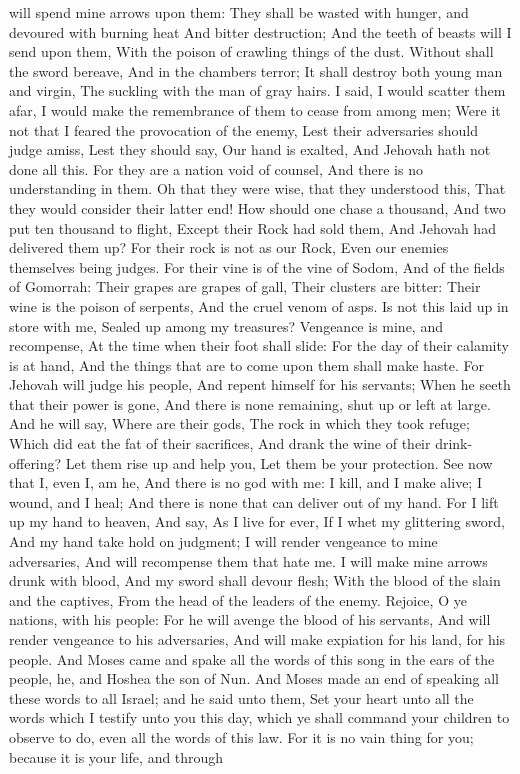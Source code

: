 will spend mine arrows upon them:  They shall be wasted with hunger, and devoured with burning heat And bitter destruction; And the teeth of beasts will I send upon them, With the poison of crawling things of the dust.  Without shall the sword bereave, And in the chambers terror; It shall destroy both young man and virgin, The suckling with the man of gray hairs.  I said, I would scatter them afar, I would make the remembrance of them to cease from among men;  Were it not that I feared the provocation of the enemy, Lest their adversaries should judge amiss, Lest they should say, Our hand is exalted, And Jehovah hath not done all this.  For they are a nation void of counsel, And there is no understanding in them.  Oh that they were wise, that they understood this, That they would consider their latter end!  How should one chase a thousand, And two put ten thousand to flight, Except their Rock had sold them, And Jehovah had delivered them up?  For their rock is not as our Rock, Even our enemies themselves being judges.  For their vine is of the vine of Sodom, And of the fields of Gomorrah: Their grapes are grapes of gall, Their clusters are bitter:  Their wine is the poison of serpents, And the cruel venom of asps.  Is not this laid up in store with me, Sealed up among my treasures?  Vengeance is mine, and recompense, At the time when their foot shall slide: For the day of their calamity is at hand, And the things that are to come upon them shall make haste.  For Jehovah will judge his people, And repent himself for his servants; When he seeth that their power is gone, And there is none remaining, shut up or left at large.  And he will say, Where are their gods, The rock in which they took refuge;  Which did eat the fat of their sacrifices, And drank the wine of their drink-offering? Let them rise up and help you, Let them be your protection.  See now that I, even I, am he, And there is no god with me: I kill, and I make alive; I wound, and I heal; And there is none that can deliver out of my hand.  For I lift up my hand to heaven, And say, As I live for ever,  If I whet my glittering sword, And my hand take hold on judgment; I will render vengeance to mine adversaries, And will recompense them that hate me.  I will make mine arrows drunk with blood, And my sword shall devour flesh; With the blood of the slain and the captives, From the head of the leaders of the enemy.  Rejoice, O ye nations, with his people: For he will avenge the blood of his servants, And will render vengeance to his adversaries, And will make expiation for his land, for his people.  And Moses came and spake all the words of this song in the ears of the people, he, and Hoshea the son of Nun. And Moses made an end of speaking all these words to all Israel; and he said unto them, Set your heart unto all the words which I testify unto you this day, which ye shall command your children to observe to do, even all the words of this law. For it is no vain thing for you; because it is your life, and through 